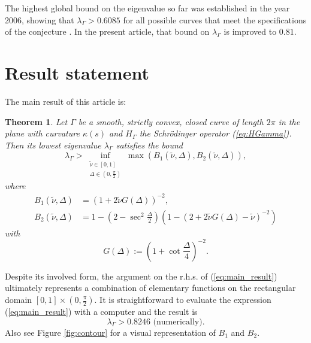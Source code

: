 \documentclass{article}
\newtheorem{theorem}[definition]{Theorem}
\begin{document}
The highest global bound on the eigenvalue so far was established in the year 2006, showing that $\lambda_\Gamma > 0.6085$ for all possible curves that meet the specifications of the conjecture \cite{Linde:ALowerBound}. 
In the present article, that bound on $\lambda_\Gamma$ is improved to $0.81$.

\section{Result statement} \label{sec:Result}

The main result of this article is:
\begin{theorem} \label{theorem:main_results}
    Let $\Gamma$ be a smooth, strictly convex, closed curve of length $2\pi$ in the plane with curvature $\kappa(s)$ and $H_\Gamma$ the Schr\"odinger operator (\ref{eq:HGamma}).
    Then its lowest eigenvalue $\lambda_\Gamma$ satisfies the bound
    \begin{equation} \label{eq:main_result}
        \lambda_\Gamma > \inf_{\substack{\tilde{\nu} \in [0,1] \\ \Delta \in (0, \frac\pi2)}} \max(B_1(\tilde\nu, \Delta), B_2(\tilde\nu, \Delta)),
    \end{equation}
    where 
    \begin{align}
        B_1(\tilde\nu, \Delta) &= \left(1 + 2\tilde\nu G(\Delta)\right)^{-2}, \label{eq:def_B1}\\
        B_2(\tilde\nu, \Delta) &= 1 -  \left(2 - \sec^2 \frac\Delta 2\right)\left( 1-\left(2+2\tilde\nu G(\Delta)-\tilde\nu\right)^{-2}\right) \label{eq:def_B2}
    \end{align}
    with
    \begin{equation} \label{eq:def_G}
        G(\Delta) :=\left(1+\cot\frac\Delta 4\right)^{-2}.
    \end{equation}
\end{theorem}

Despite its involved form, the argument on the r.h.s. of (\ref{eq:main_result}) ultimately represents a combination of elementary functions on the rectangular domain $[0,1]\times(0,\frac\pi2)$.
It is straightforward to evaluate the expression (\ref{eq:main_result}) with a computer and the result is 
\begin{equation}
    \lambda_\Gamma > 0.8246 \text{ (numerically).}
\end{equation}
Also see Figure \ref{fig:contour} for a visual representation of $B_1$ and $B_2$.
\end{document}
